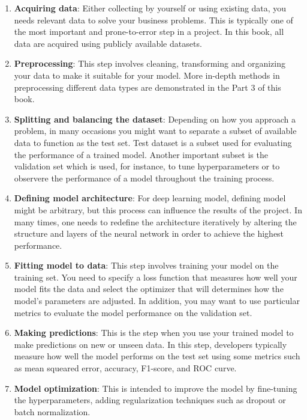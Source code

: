 \documentclass[
  letterpaper,
  DIV=11,
  numbers=noendperiod]{scrreprt}
\providecommand{\tightlist}{%
  \setlength{\itemsep}{0pt}\setlength{\parskip}{0pt}}\usepackage{longtable,booktabs,array}
\begin{document}
\begin{enumerate}
\def\labelenumi{\arabic{enumi}.}
\tightlist
\item
  \textbf{Acquiring data}: Either collecting by yourself or using
  existing data, you needs relevant data to solve your business
  problems. This is typically one of the most important and
  prone-to-error step in a project. In this book, all data are acquired
  using publicly available datasets.
\item
  \textbf{Preprocessing}: This step involves cleaning, transforming and
  organizing your data to make it suitable for your model. More in-depth
  methods in preprocessing different data types are demonstrated in the
  Part 3 of this book.
\item
  \textbf{Splitting and balancing the dataset}: Depending on how you
  approach a problem, in many occasions you might want to separate a
  subset of available data to function as the test set. Test dataset is
  a subset used for evaluating the performance of a trained model.
  Another important subset is the validation set which is used, for
  instance, to tune hyperparameters or to observere the performance of a
  model throughout the training process.
\item
  \textbf{Defining model architecture}: For deep learning model,
  defining model might be arbitrary, but this process can influence the
  results of the project. In many times, one needs to redefine the
  architecture iteratively by altering the structure and layers of the
  neural network in order to achieve the highest performance.
\item
  \textbf{Fitting model to data}: This step involves training your model
  on the training set. You need to specify a loss function that measures
  how well your model fits the data and select the optimizer that will
  determines how the model's parameters are adjusted. In addition, you
  may want to use particular metrics to evaluate the model performance
  on the validation set.
\item
  \textbf{Making predictions}: This is the step when you use your
  trained model to make predictions on new or unseen data. In this step,
  developers typically measure how well the model performs on the test
  set using some metrics such as mean squeared error, accuracy,
  F1-score, and ROC curve.
\item
  \textbf{Model optimization}: This is intended to improve the model by
  fine-tuning the hyperparameters, adding regularization techniques such
  as dropout or batch normalization.
\end{enumerate}
\end{document}
